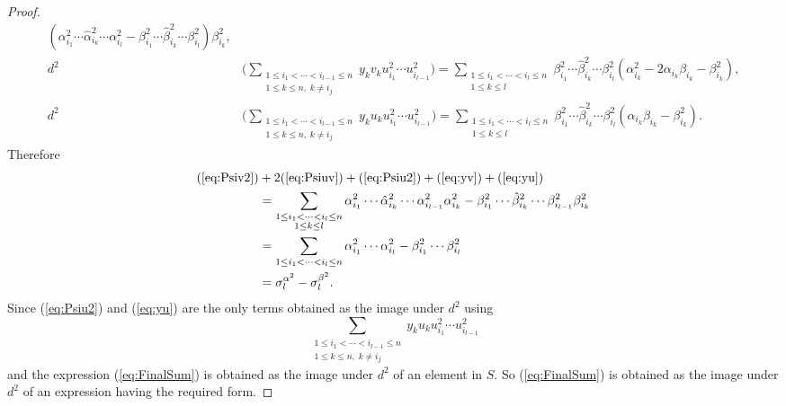 \documentclass{article}
\theoremstyle{plain}
\theoremstyle{definition}
\numberwithin{thm}{section}
\begin{document}
\begin{proof}
\begin{align}
				{(\alpha_{i_1}^2\cdots\hat{\alpha}_{i_k}^2\cdots\alpha^2_{i_{l}}-\beta_{i_1}^2\cdots\hat{\beta}_{i_k}^2\cdots\beta^2_{i_{l}})\beta^2_{i_k}} \label{eq:Psiu2}, \\
				d^2&\big(\sum_{\substack{1\leq i_1<\cdots<i_{l-1}\leq n \\ 1\leq k \leq n, \; k\neq i_j }}{y_kv_ku_{i_1}^2\cdots u^2_{i_{l-1}}}\big) 
				=\sum_{\substack{1\leq i_1<\cdots<i_{l}\leq n \\ 1\leq k \leq l}}{\beta_{i_1}^2\cdots\hat{\beta}_{i_k}^2\cdots\beta^2_{i_{l}}
				(\alpha^2_{i_k}-2\alpha_{i_k}\beta_{i_k}-\beta_{i_k}^2)}
				\label{eq:yv}, \\
				d^2&\big(\sum_{\substack{1\leq i_1<\cdots<i_{l-1}\leq n \\ 1\leq k \leq n, \; k\neq i_j }}{y_ku_ku_{i_1}^2\cdots u^2_{i_{l-1}}}\big) 
				=\sum_{\substack{1\leq i_1<\cdots<i_{l}\leq n \\ 1\leq k \leq l}}{\beta_{i_1}^2\cdots\hat{\beta}_{i_k}^2\cdots\beta^2_{i_{l}}
				(\alpha_{i_k}\beta_{i_k}-\beta_{i_k}^2)}
				\label{eq:yu}
				.
			\end{align}
			Therefore
			\begin{align}
				(\ref{eq:Psiv2})&+2(\ref{eq:Psiuv})+(\ref{eq:Psiu2})+(\ref{eq:yv})+(\ref{eq:yu}) \label{eq:FinalSum}\\
				&=\sum_{\substack{1\leq i_1<\cdots<i_{l}\leq n \\ 1\leq k \leq l}}
				{\alpha_{i_1}^2\cdots\hat{\alpha}_{i_k}^2\cdots\alpha^2_{i_{l-1}}\alpha_{i_k}^2-\beta_{i_1}^2\cdots\hat{\beta}_{i_k}^2\cdots\beta^2_{i_{l-1}}\beta_{i_k}^2} 	
				\nonumber\\
				&=\sum_{1\leq i_1<\cdots<i_l\leq n}
				{\alpha_{i_1}^2\cdots\alpha^2_{i_l}-\beta_{i_1}^2\cdots \beta^2_{i_l}} \nonumber\\
				&=\sigma_{l}^{\alpha^2}-\sigma_{l}^{\beta^2}. \nonumber
			\end{align}
			Since (\ref{eq:Psiu2}) and (\ref{eq:yu}) are the only terms obtained as the image under $d^2$ using
			\begin{equation*}
				\sum_{\substack{1\leq i_1<\cdots<i_{l-1}\leq n \\ 1\leq k \leq n, \; k\neq i_j }}{y_ku_ku_{i_1}^2\cdots u^2_{i_{l-1}}}
			\end{equation*}
			and the expression (\ref{eq:FinalSum}) is obtained as the image under $d^2$ of an element in $S$.
			So (\ref{eq:FinalSum}) is obtained as the image under $d^2$ of an expression having the required form.
		\end{proof}
		
\end{document}
